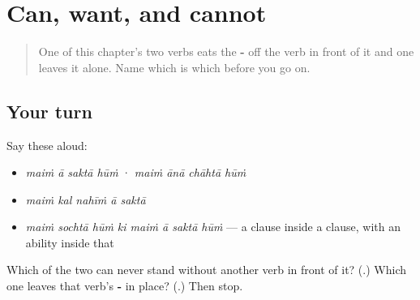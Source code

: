 \section[\texorpdfstring{… \hi{सकना} · … \hi{चाहना} (… saknā · … chāhnā)}{… सकना · … चाहना (… saknā · … chāhnā)}]{Can, want, and cannot}

\label{lesson:HI-R70-can-want}



\begin{quote}
One of this chapter's two verbs eats the \textbf{-} off the verb in front of it and one leaves it alone. Name which is which before you go on.
\end{quote}

\subsection*{Your turn}
Say these aloud:

\begin{itemize}
\raggedright
  \item \emph{maiṁ ā saktā hūṁ} · \emph{maiṁ ānā chāhtā hūṁ}
  \item \emph{maiṁ kal nahīṁ ā saktā}
  \item \emph{maiṁ sochtā hūṁ ki maiṁ ā saktā hūṁ} — a clause inside a clause, with an ability inside that
\end{itemize}

\begin{tcolorbox}[breakable,colback=teal!4,colframe=teal!35!black,title={Before you move on}]
Which of the two can never stand without another verb in front of it? (\textbf{}.) Which one leaves that verb's \textbf{-} in place? (\textbf{}.) Then stop.
\end{tcolorbox}
